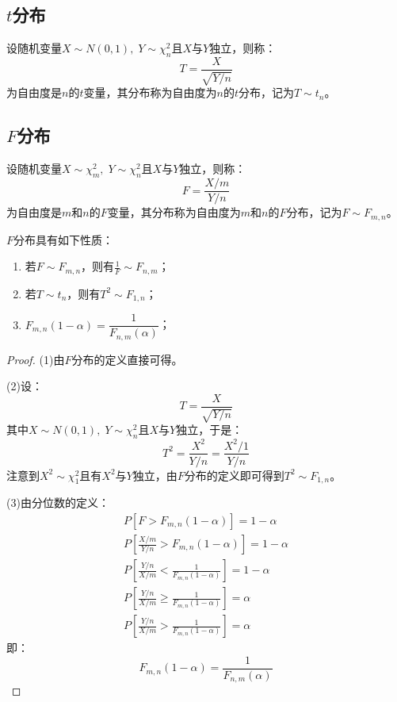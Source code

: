 \subsection{$t$分布}
\begin{definition}
	设随机变量$X\sim N(0,1),\;Y\sim\chi_n^2$且$X$与$Y$独立，则称：
	\begin{equation*}
		T=\frac{X}{\sqrt{Y/ n}}
	\end{equation*}
	为自由度是$n$的$t$变量，其分布称为自由度为$n$的$t$分布，记为$T\sim t_n$。
\end{definition}

\subsection{$F$分布}
\begin{definition}
	设随机变量$X\sim \chi_m^2,\;Y\sim\chi_n^2$且$X$与$Y$独立，则称：
	\begin{equation*}
		F=\frac{X/m}{Y/n}
	\end{equation*}
	为自由度是$m$和$n$的$F$变量，其分布称为自由度为$m$和$n$的$F$分布，记为$F\sim F_{m,n}$。
\end{definition}
\begin{property}
	$F$分布具有如下性质：
	\begin{enumerate}
		\item 若$F\sim F_{m,n}$，则有$\frac{1}{F}\sim F_{n,m}$；
		\item 若$T\sim t_n$，则有$T^2\sim F_{1,n}$；
		\item $F_{m,n}(1-\alpha)=\dfrac{1}{F_{n,m}(\alpha)}$；
	\end{enumerate}
\end{property}
\begin{proof}
	(1)由$F$分布的定义直接可得。\par
	(2)设：
	\begin{equation*}
		T=\frac{X}{\sqrt{Y/n}}
	\end{equation*}
	其中$X\sim N(0,1),\;Y\sim\chi_n^2$且$X$与$Y$独立，于是：
	\begin{equation*}
		T^2=\frac{X^2}{Y/n}=\frac{X^2/1}{Y/n}
	\end{equation*}
	注意到$X^2\sim\chi_1^2$且有$X^2$与$Y$独立，由$F$分布的定义即可得到$T^2\sim F_{1,n}$。\par
	(3)由分位数的定义：
	\begin{gather*}
		P[F>F_{m,n}(1-\alpha)]=1-\alpha \\
		P\left[\frac{X/m}{Y/n}>F_{m,n}(1-\alpha)\right]=1-\alpha \\
		P\left[\frac{Y/n}{X/m}<\frac{1}{F_{m,n}(1-\alpha)}\right]=1-\alpha \\
		P\left[\frac{Y/n}{X/m}\geqslant\frac{1}{F_{m,n}(1-\alpha)}\right]=\alpha \\
		P\left[\frac{Y/n}{X/m}>\frac{1}{F_{m,n}(1-\alpha)}\right]=\alpha
	\end{gather*}
	即：
	\begin{equation*}
		F_{m,n}(1-\alpha)=\frac{1}{F_{n,m}(\alpha)}
	\end{equation*}
\end{proof}